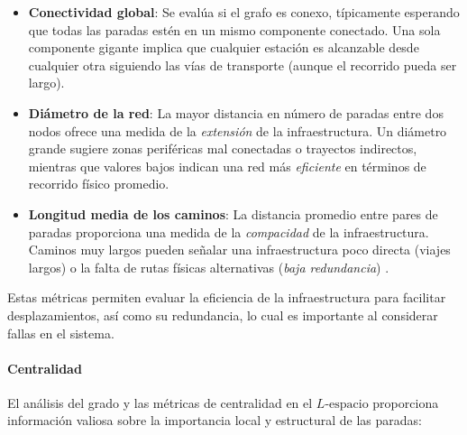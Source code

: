            \begin{itemize}
                \item \textbf{Conectividad global}: Se evalúa si el grafo es conexo, típicamente esperando que todas las paradas estén en un mismo componente conectado. Una sola componente gigante implica que cualquier estación es alcanzable desde cualquier otra siguiendo las vías de transporte (aunque el recorrido pueda ser largo).
                
                \item \textbf{Diámetro de la red}: La mayor distancia en número de paradas entre dos nodos ofrece una medida de la \textit{extensión} de la infraestructura. Un diámetro grande sugiere zonas periféricas mal conectadas o trayectos indirectos, mientras que valores bajos indican una red más \textit{eficiente} en términos de recorrido físico promedio. \cite{barraza2021, rodrigues2020}
                
                \item \textbf{Longitud media de los caminos}: La distancia promedio entre pares de paradas proporciona una medida de la \textit{compacidad} de la infraestructura. Caminos muy largos pueden señalar una infraestructura poco directa (viajes largos) o la falta de rutas físicas alternativas (\textit{baja redundancia}) \cite{rodrigues2020}.
            \end{itemize}

             Estas métricas permiten evaluar la eficiencia de la infraestructura para facilitar desplazamientos, así como su redundancia, lo cual es importante al considerar fallas en el sistema.

            \paragraph{Centralidad}
            El análisis del grado y las métricas de centralidad en el $L\text{-espacio}$ proporciona información valiosa sobre la importancia local y estructural de las paradas:

